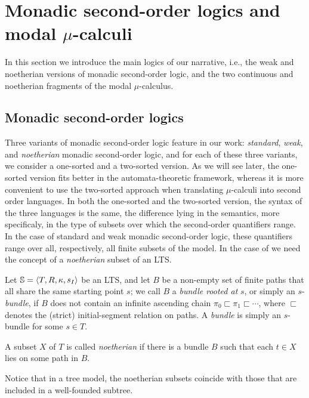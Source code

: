 \section{Monadic second-order logics and modal $\mu$-calculi}
\label{s:mso-mu}

In this section we introduce the main logics of our narrative, i.e., the 
weak and noetherian versions of monadic second-order logic, and the two 
continuous and noetherian fragments of the modal $\mu$-calculus.

 \subsection{Monadic second-order logics}
\label{sec:prel-so}
% 

Three variants of monadic second-order logic feature in our work:
\emph{standard}, \emph{weak}, and \emph{noetherian} monadic second-order 
logic, and for each of these three variants, we consider a one-sorted and 
a two-sorted version.
As we will see later, the one-sorted version fits better in the 
automata-theoretic framework, whereas it is more convenient to use the 
two-sorted approach when translating $\mu$-calculi into second order languages.
In both the one-sorted and the two-sorted version, the syntax of the three 
languages is the same, the difference lying in the semantics, more specificaly,
in the type of subsets over which the second-order quantifiers range.
In the case of standard and weak monadic second-order logic, these quantifiers 
range over all, respectively, all finite subsets of the model.
In the case of \nmso we need the concept of a \emph{noetherian} subset of an LTS.

\begin{definition}
\label{d:bundle1}
Let $\mathbb{S} = \langle{T,R,\kappa, s_I}\rangle$ be an LTS, and let $B$ be a non-empty set 
of finite paths that all share the same starting point $s$; we call $B$ a 
\emph{bundle rooted at} $s$, or simply an $s$-\emph{bundle}, if $B$ does not
contain an infinite ascending chain $\pi_{0} \sqsubset \pi_{1} \sqsubset 
\cdots$, where $\sqsubset$ denotes the (strict) initial-segment relation on 
paths.
A \emph{bundle} is simply an $s$-bundle for some $s \in T$.

A subset $X$ of $T$ is called \emph{noetherian} if there is a bundle $B$ such
that each $t \in X$ lies on some path in $B$.
\end{definition}

Notice that in a tree model, the noetherian subsets coincide with those that
are included in a well-founded subtree.

